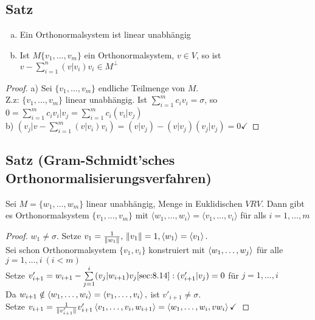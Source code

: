 \subsection{Satz}
\begin{enumerate}[a)]
\item Ein Orthonormalsystem ist linear unabhängig
\item Ist $M \{ v_1,\ldots,v_m \}$ ein Orthonormalsystem, $v \in V$, so ist $v - \sum\limits^{n}_{i=1} (v|v_i)v_i \in M^\perp$\\
\end{enumerate}
\begin{proof}
a) Sei $\{ v_1,\ldots,v_m \}$ endliche Teilmenge von $M$.\\
Z.z: $\{ v_1,\ldots,v_m \}$ linear unabhängig. Ist $ \sum\limits^{m}_{i=1} c_iv_i = \sigma$, so $0 = \sum\limits^{m}_{i=1} c_iv_i | v_j = \sum\limits^{m}_{i=1} c_i (v_i|v_j)$\\
b) $(v_j|v - \sum\limits^{m}_{i=1}(v|v_i)v_i) = (v|v_j) - (v|v_j) (v_j|v_j) = 0 \checkmark$
\end{proof}
\subsection{Satz (Gram-Schmidt'sches\\ Orthonormalisierungsverfahren)}
Sei $M = \{ w_1,\ldots,w_m \}$ linear unabhängig, Menge in Euklidischen $VR V$. Dann gibt es Orthonormalsystem $\{ v_1,\ldots,v_m \}$ mit $\langle w_1,\ldots,w_i \rangle = \langle v_1,\ldots,v_i \rangle$ für alls $i = 1,\ldots,m$
\begin{proof}
$w_1 \ne \sigma$. Setze $v_1 = \frac1{\Vert w_1\Vert},\, \Vert v_1\Vert = 1, \langle w_1 \rangle = \left\langle v_1\right\rangle.$\\
Sei schon Orthonormalsystem $\{v_1,v_i\}$ konstruiert mit $\left\langle w_1,\ldots,w_j\right\rangle$ für alle $j=1,\ldots,i\ (i < m)$\\
Setze $v'_{i+1} = w_{i+1} - \sum\limits^{i}_{j=1}(v_j|w_{i+1})v_j
\ref{sec:8.14}: (v'_{i+1}|v_j) = 0$ für $j=1,\ldots,i$\\
Da $w_{i+1} \notin \left\langle w_1,\ldots,w_i\right\rangle = \left\langle v_1,\ldots,v_i\right\rangle,$ ist $v'_{i+1} \ne \sigma$.\\
Setze $v_{i+1} = \frac1{\Vert v'_{i+1}\Vert} v'_{i+1}\\
\left\langle v_1,\ldots,v_i,w_{i+1}\right\rangle = \left\langle w_1,\ldots,w_i,vw_{i}\right\rangle \checkmark$  
\end{proof}
